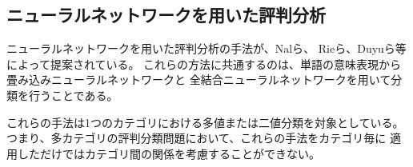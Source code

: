 \documentclass{ttisummary}
\begin{document}


\subsection{ニューラルネットワークを用いた評判分析}

ニューラルネットワークを用いた評判分析の手法が、Nalら\cite{nal14}、
Rieら\cite{rie14}、Duyuら\cite{duyu15}等によって提案されている。
これらの方法に共通するのは、単語の意味表現から畳み込みニューラルネットワークと
全結合ニューラルネットワークを用いて分類を行うことである。

これらの手法は1つのカテゴリにおける多値または二値分類を対象としている。
つまり、多カテゴリの評判分類問題において、これらの手法をカテゴリ毎に
適用しただけではカテゴリ間の関係を考慮することができない。
\end{document}
